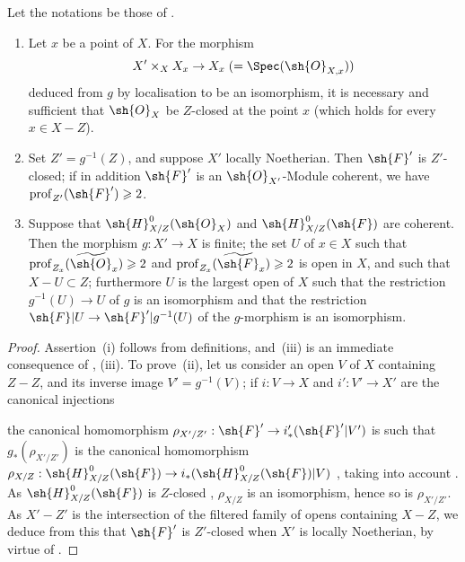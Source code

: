 \begin{proposition}[5.10.12]
\label{IV.5.10.12}
Let the notations be those of .
\begin{enumerate}[label=\emph{\roman*)}]
  \item Let $x$ be a point of $X$.
For the morphism
\[
  X'\times_X X_x\to X_x\;(=\Spec(\sh{O}_{X,x}))
\]
deduced from $g$ by localisation to be an isomorphism, it is necessary and sufficient that $\sh{O}_X$ be $Z$-closed at the point $x$ (which holds for every $x\in X-Z$).
  \item Set $Z'=g^{-1}(Z)$, and suppose $X'$ locally Noetherian.
Then $\sh{F}'$ is $Z'$-closed; if in addition $\sh{F}'$ is an $\sh{O}_{X'}$-Module coherent, we have $\operatorname{prof}_{Z'}(\sh{F}')\geqslant 2$.
  \item Suppose that $\sh{H}^0_{X/Z}(\sh{O}_X)$ and $\sh{H}^0_{X/Z}(\sh{F})$ are coherent.
Then the morphism $g:X'\to X$ is finite; the set $U$ of $x\in X$ such that $\operatorname{prof}_{Z_x}(\widetilde{\sh{O}}_x)\geqslant 2$ and $\operatorname{prof}_{Z_x}(\widetilde{\sh{F}}_x)\geqslant 2$ is open in $X$, and such that $X-U\subset Z$; furthermore $U$ is the largest open of $X$ such that the restriction $g^{-1}(U)\to U$ of $g$ is an isomorphism and that the restriction $\sh{F}|U\to\sh{F}'|g^{-1}(U)$ of the $g$-morphism is an isomorphism.
\end{enumerate}
\end{proposition}

\begin{proof}
Assertion~(i) follows from definitions, and~(iii) is an immediate consequence of , (iii).
To prove~(ii), let us consider an open $V$ of $X$ containing $Z-Z$, and its inverse image $V'=g^{-1}(V)$; if $i:V\to X$ and $i':V'\to X'$ are the canonical injections


the canonical homomorphism $\rho_{X'/Z'}:\sh{F}'\to i'_*(\sh{F}'|V')$ is such that $g_*(\rho_{X'/Z'})$ is the canonical homomorphism $\rho_{X/Z}:\sh{H}^0_{X/Z}(\sh{F})\to i_*(\sh{H}^0_{X/Z}(\sh{F})|V)$ , taking into account .
As $\sh{H}^0_{X/Z}(\sh{F})$ is $Z$-closed , $\rho_{X/Z}$ is an isomorphism, hence so is $\rho_{X'/Z'}$.
As $X'-Z'$ is the intersection of the filtered family of opens containing $X-Z$, we deduce from this that $\sh{F}'$ is $Z'$-closed when $X'$ is locally Noetherian, by virtue of .
\end{proof}

